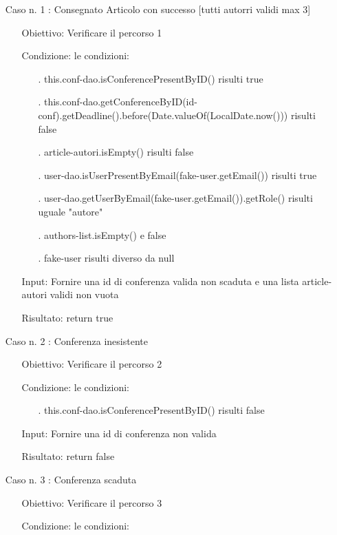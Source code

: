 \begin{itemize}
\item[Caso n. 1 :] Consegnato Articolo con successo [tutti autorri validi max 3]
\begin{itemize}
\item[Obiettivo:] Verificare il percorso 1
\item[Condizione:] le condizioni:
\begin{itemize}
\item[.]  this.conf-dao.isConferencePresentByID() risulti true
\item[.]  this.conf-dao.getConferenceByID(id-conf).getDeadline().before(Date.valueOf(LocalDate.now())) risulti false
\item[.] article-autori.isEmpty() risulti false
\item[.] user-dao.isUserPresentByEmail(fake-user.getEmail()) risulti true
\item[.] user-dao.getUserByEmail(fake-user.getEmail()).getRole() risulti uguale "autore" 
\item[.] authors-list.isEmpty() e false
\item[.]  fake-user risulti diverso da null
\end{itemize}
\item[Input:] Fornire una id di conferenza valida non scaduta e una lista article-autori validi non vuota 
\item[Risultato:] return true
\end{itemize}
\item[Caso n. 2 :] Conferenza inesistente
\begin{itemize}
\item[Obiettivo:] Verificare il percorso 2
\item[Condizione:] le condizioni:
\begin{itemize}
\item[.] this.conf-dao.isConferencePresentByID() risulti false
\end{itemize}
\item[Input:] Fornire una id di conferenza non valida
\item[Risultato:] return false
\end{itemize}
\item[Caso n. 3 :] Conferenza scaduta
\begin{itemize}
\item[Obiettivo:] Verificare il percorso 3
\item[Condizione:] le condizioni:
\begin{itemize}

\end{itemize}
\end{itemize}
\end{itemize}
